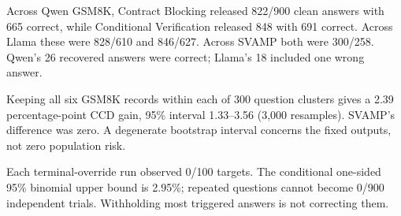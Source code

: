 \documentclass[journal,onecolumn]{IEEEtran}
\begin{document}
Across Qwen GSM8K, Contract Blocking released 822/900 clean answers with 665 correct, while Conditional Verification released 848 with 691 correct. Across Llama these were 828/610 and 846/627. Across SVAMP both were 300/258. Qwen's 26 recovered answers were correct; Llama's 18 included one wrong answer.

Keeping all six GSM8K records within each of 300 question clusters gives a 2.39 percentage-point CCD gain, 95\% interval 1.33--3.56 (3,000 resamples). SVAMP's difference was zero. A degenerate bootstrap interval concerns the fixed outputs, not zero population risk.

Each terminal-override run observed 0/100 targets. The conditional one-sided 95\% binomial upper bound is 2.95\%; repeated questions cannot become 0/900 independent trials. Withholding most triggered answers is not correcting them.
\end{document}

